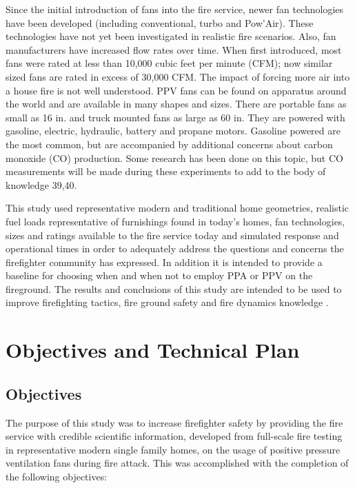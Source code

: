 \documentclass{article}
\begin{document}
Since the initial introduction of fans into the fire service, newer fan technologies have been developed (including conventional, turbo and Pow’Air). These technologies have not yet been investigated in realistic fire scenarios. Also, fan manufacturers have increased flow rates over time. When first introduced, most fans were rated at less than 10,000 cubic feet per minute (CFM); now similar sized fans are rated in excess of 30,000 CFM. The impact of forcing more air into a house fire is not well understood. PPV fans can be found on apparatus around the world and are available in many shapes and sizes. There are portable fans as small as 16 in. and truck mounted fans as large as 60 in. They are powered with gasoline, electric, hydraulic, battery and propane motors. Gasoline powered are the most common, but are accompanied by additional concerns about carbon monoxide (CO) production. Some research has been done on this topic, but CO measurements will be made during these experiments to add to the body of knowledge 39,40. 

This study used representative modern and traditional home geometries, realistic fuel loads representative of furnishings found in today’s homes, fan technologies, sizes and ratings available to the fire service today and simulated response and operational times in order to adequately address the questions and concerns the firefighter community has expressed. In addition it is intended to provide a baseline for choosing when and when not to employ PPA or PPV on the fireground. The results and conclusions of this study are intended to be used to improve firefighting tactics, fire ground safety and fire dynamics knowledge \cite{KerberMadrzyPPVInHighRise} \cite{LougheedPPVHighRise}.

\clearpage

\section{Objectives and Technical Plan}

\subsection {Objectives}

The purpose of this study was to increase firefighter safety by providing the fire service with credible scientific information, developed from full-scale fire testing in representative modern single family homes, on the usage of positive pressure ventilation fans during fire attack. This was accomplished with the completion of the following objectives:
\end{document}
